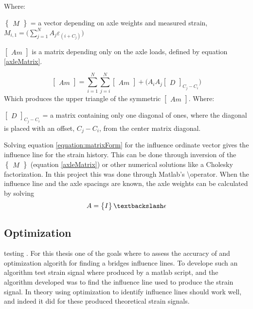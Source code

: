 Where:
\begin{description}
\item $\begin{Bmatrix} M \end{Bmatrix}$ = a vector depending on axle weights and measured strain, $M_{i, 1} = \Big(\sum_{j = 1}^{N} A_j \varepsilon_{(i+C_j)}\Big)$
\item $\begin{bmatrix} Am \end{bmatrix}$ is a matrix depending only on the axle loads, defined by equation \ref{axleMatrix}.
\end{description}
\begin{equation}
\begin{bmatrix} Am \end{bmatrix} = \sum_{i = 1}^{N} \sum_{j = i}^{N} \begin{bmatrix} Am \end{bmatrix} + \big( A_i A_j  \begin{bmatrix} D \end{bmatrix}_{C_j - C_i}\big)
\label{axleMatrix}
\end{equation}
Which produces the upper triangle of the symmetric $ \begin{bmatrix} Am \end{bmatrix} $.
Where:
\begin{description}
\item $\begin{bmatrix} D \end{bmatrix}_{C_j - C_i}$ = a matrix containing only one diagonal of ones, where the diagonal is placed with an offset, $C_j - C_i$, from the center matrix diagonal.
\end{description}
Solving equation \ref{equation:matrixForm} for the influence ordinate vector gives the influence line for the strain history. This can be done through inversion of the $\begin{Bmatrix} M \end{Bmatrix}$ (equation \ref{axleMatrix}) or other numerical solutions like a Cholesky factorization. In this project this was done through Matlab's \textbackslash operator.
When the influence line and the axle spacings are known, the axle weights can be calculated by solving
\begin{equation}
	A = \begin{Bmatrix} I \end{Bmatrix} \textbackslash \epsilon
\end{equation}
\subsection{Optimization}
testing \cite{Liljencrantz}.
For this thesis one of the goals where to assess the accuracy of and optimization algorith for finding a bridges influence lines. To develope such an algorithm test strain signal where produced by a matlab script, and the algorithm developed was to find the influence line used to produce the strain signal.
In theory using optimization to identify influence lines should work well, and indeed it did for these produced theoretical strain signals.

